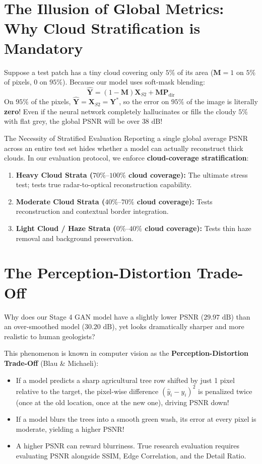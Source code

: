 \section{The Illusion of Global Metrics: Why Cloud Stratification is Mandatory}
Suppose a test patch has a tiny cloud covering only $5\%$ of its area ($\mathbf{M} = 1$ on $5\%$ of pixels, $0$ on $95\%$).
Because our model uses soft-mask blending:
\[
\hat{\mathbf{Y}} = (1 - \mathbf{M})\mathbf{X}_{S2} + \mathbf{M}\mathbf{P}_{\text{dir}}
\]
On $95\%$ of the pixels, $\hat{\mathbf{Y}} = \mathbf{X}_{S2} = \mathbf{Y}^*$, so the error on $95\%$ of the image is literally \textbf{zero}!
Even if the neural network completely hallucinates or fills the cloudy $5\%$ with flat grey, the global PSNR will be over $38\text{ dB}$!

\begin{warningbox}{The Necessity of Stratified Evaluation}
Reporting a single global average PSNR across an entire test set hides whether a model can actually reconstruct thick clouds. In our evaluation protocol, we enforce \textbf{cloud-coverage stratification}:
\begin{enumerate}
    \item \textbf{Heavy Cloud Strata ($70\%\text{--}100\%$ cloud coverage):} The ultimate stress test; tests true radar-to-optical reconstruction capability.
    \item \textbf{Moderate Cloud Strata ($40\%\text{--}70\%$ cloud coverage):} Tests reconstruction and contextual border integration.
    \item \textbf{Light Cloud / Haze Strata ($0\%\text{--}40\%$ cloud coverage):} Tests thin haze removal and background preservation.
\end{enumerate}
\end{warningbox}

\section{The Perception-Distortion Trade-Off}
Why does our Stage 4 GAN model have a slightly lower PSNR ($29.97\text{ dB}$) than an over-smoothed model ($30.20\text{ dB}$), yet looks dramatically sharper and more realistic to human geologists?

This phenomenon is known in computer vision as the \textbf{Perception-Distortion Trade-Off} (Blau \& Michaeli):
\begin{itemize}
    \item If a model predicts a sharp agricultural tree row shifted by just 1 pixel relative to the target, the pixel-wise difference $(\hat{y}_i - y_i)^2$ is penalized twice (once at the old location, once at the new one), driving PSNR down!
    \item If a model blurs the trees into a smooth green wash, its error at every pixel is moderate, yielding a higher PSNR!
    \item A higher PSNR can reward blurriness. True research evaluation requires evaluating PSNR alongside SSIM, Edge Correlation, and the Detail Ratio.
\end{itemize}

